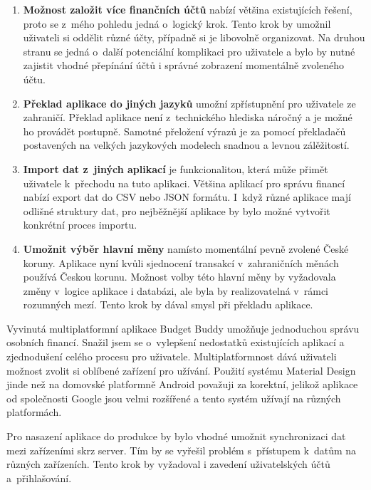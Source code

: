 \documentclass[
  biblatex,
  figures=true,
  tables=false,
  glossaries,
  index
]{kidiplom}
\begin{document}
\begin{enumerate}
  \item \textbf{Možnost založit více finančních účtů} nabízí většina existujících řešení, proto se z~mého pohledu jedná o~logický krok. Tento krok by umožnil uživateli si oddělit různé účty, případně si je libovolně organizovat. Na druhou stranu se jedná o~další potenciální komplikaci pro uživatele a bylo by nutné zajistit vhodné přepínání účtů i správné zobrazení momentálně zvoleného účtu.
  \item \textbf{Překlad aplikace do jiných jazyků} umožní zpřístupnění pro uživatele ze zahraničí. Překlad aplikace není z~technického hlediska náročný a je možné ho provádět postupně. Samotné přeložení výrazů je za pomocí překladačů postavených na velkých jazykových modelech snadnou a levnou zálěžitostí.
  \item \textbf{Import dat z~jiných aplikací} je funkcionalitou, která může přimět uživatele k~přechodu na tuto aplikaci. Většina aplikací pro správu financí nabízí export dat do CSV nebo JSON formátu. I~když různé aplikace mají odlišné struktury dat, pro nejběžnější aplikace by bylo možné vytvořit konkrétní proces importu.
  \item \textbf{Umožnit výběr hlavní měny} namísto momentální pevně zvolené České koruny. Aplikace nyní kvůli sjednocení transakcí v~zahraničních měnách používá Českou korunu. Možnost volby této hlavní měny by vyžadovala změny v~logice aplikace i databázi, ale byla by realizovatelná v~rámci rozumných mezí. Tento krok by dával smysl při překladu aplikace.
\end{enumerate}

\begin{kiconclusions}
Vyvinutá multiplatformní aplikace Budget Buddy umožňuje jednoduchou správu osobních financí. Snažil jsem se o~vylepšení nedostatků existujících aplikací a zjednodušení celého procesu pro uživatele. Multiplatformnost dává uživateli možnost zvolit si oblíbené zařízení pro užívání. Použití systému Material Design jinde než na domovské platformně Android považuji za korektní, jelikož aplikace od společnosti Google jsou velmi rozšířené a tento systém užívají na různých platformách.

Pro nasazení aplikace do produkce by bylo vhodné umožnit synchronizaci dat mezi zařízeními skrz server. Tím by se vyřešil problém s~přístupem k~datům na různých zařízeních. Tento krok by vyžadoval i zavedení uživatelských účtů a~přihlašování.
\end{kiconclusions}
\end{document}
